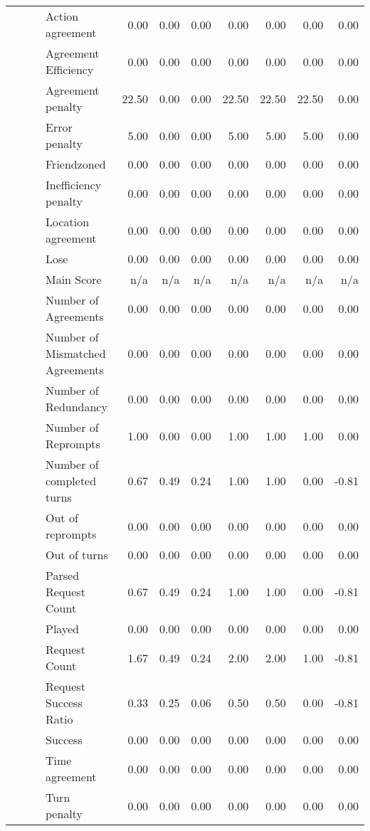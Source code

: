 \begin{tabular}{llllrrrrrrr}
 &  &  & Action agreement & 0.00 & 0.00 & 0.00 & 0.00 & 0.00 & 0.00 & 0.00 \\
 &  &  & Agreement Efficiency & 0.00 & 0.00 & 0.00 & 0.00 & 0.00 & 0.00 & 0.00 \\
 &  &  & Agreement penalty & 22.50 & 0.00 & 0.00 & 22.50 & 22.50 & 22.50 & 0.00 \\
 &  &  & Error penalty & 5.00 & 0.00 & 0.00 & 5.00 & 5.00 & 5.00 & 0.00 \\
 &  &  & Friendzoned & 0.00 & 0.00 & 0.00 & 0.00 & 0.00 & 0.00 & 0.00 \\
 &  &  & Inefficiency penalty & 0.00 & 0.00 & 0.00 & 0.00 & 0.00 & 0.00 & 0.00 \\
 &  &  & Location agreement & 0.00 & 0.00 & 0.00 & 0.00 & 0.00 & 0.00 & 0.00 \\
 &  &  & Lose & 0.00 & 0.00 & 0.00 & 0.00 & 0.00 & 0.00 & 0.00 \\
 &  &  & Main Score & n/a & n/a & n/a & n/a & n/a & n/a & n/a \\
 &  &  & Number of Agreements & 0.00 & 0.00 & 0.00 & 0.00 & 0.00 & 0.00 & 0.00 \\
 &  &  & Number of Mismatched Agreements & 0.00 & 0.00 & 0.00 & 0.00 & 0.00 & 0.00 & 0.00 \\
 &  &  & Number of Redundancy & 0.00 & 0.00 & 0.00 & 0.00 & 0.00 & 0.00 & 0.00 \\
 &  &  & Number of Reprompts & 1.00 & 0.00 & 0.00 & 1.00 & 1.00 & 1.00 & 0.00 \\
 &  &  & Number of completed turns & 0.67 & 0.49 & 0.24 & 1.00 & 1.00 & 0.00 & -0.81 \\
 &  &  & Out of reprompts & 0.00 & 0.00 & 0.00 & 0.00 & 0.00 & 0.00 & 0.00 \\
 &  &  & Out of turns & 0.00 & 0.00 & 0.00 & 0.00 & 0.00 & 0.00 & 0.00 \\
 &  &  & Parsed Request Count & 0.67 & 0.49 & 0.24 & 1.00 & 1.00 & 0.00 & -0.81 \\
 &  &  & Played & 0.00 & 0.00 & 0.00 & 0.00 & 0.00 & 0.00 & 0.00 \\
 &  &  & Request Count & 1.67 & 0.49 & 0.24 & 2.00 & 2.00 & 1.00 & -0.81 \\
 &  &  & Request Success Ratio & 0.33 & 0.25 & 0.06 & 0.50 & 0.50 & 0.00 & -0.81 \\
 &  &  & Success & 0.00 & 0.00 & 0.00 & 0.00 & 0.00 & 0.00 & 0.00 \\
 &  &  & Time agreement & 0.00 & 0.00 & 0.00 & 0.00 & 0.00 & 0.00 & 0.00 \\
 &  &  & Turn penalty & 0.00 & 0.00 & 0.00 & 0.00 & 0.00 & 0.00 & 0.00 \\

\end{tabular}
